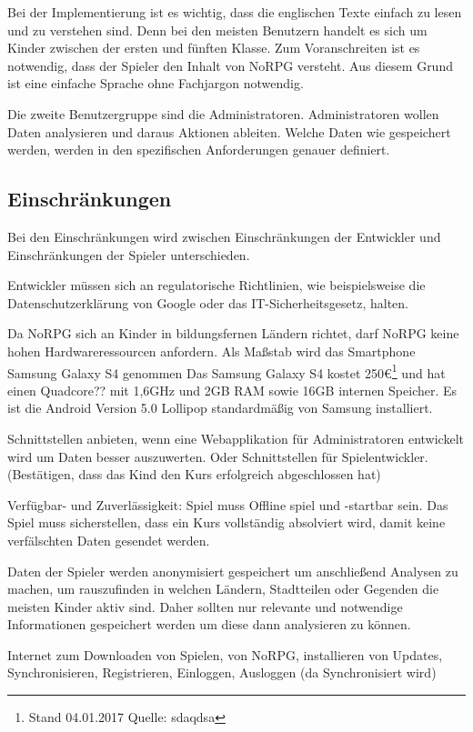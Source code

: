		Bei der Implementierung ist es wichtig, dass die englischen Texte einfach zu lesen und zu verstehen sind. Denn bei den meisten Benutzern handelt es sich um Kinder zwischen der ersten und fünften Klasse. Zum Voranschreiten ist es notwendig, dass der Spieler den Inhalt von NoRPG versteht. Aus diesem Grund ist eine einfache Sprache ohne Fachjargon notwendig.
		
		Die zweite Benutzergruppe sind die Administratoren.	Administratoren wollen Daten analysieren und daraus Aktionen ableiten. Welche Daten wie gespeichert werden, werden in den spezifischen Anforderungen genauer definiert. 
			
	\subsection{Einschränkungen}
		Bei den Einschränkungen wird zwischen Einschränkungen der Entwickler und Einschränkungen der Spieler unterschieden.
		
		Entwickler müssen sich an regulatorische Richtlinien, wie beispielsweise die Datenschutzerklärung von Google oder das IT-Sicherheitsgesetz, halten.
				
		Da NoRPG sich an Kinder in bildungsfernen Ländern richtet, darf NoRPG keine hohen Hardwareressourcen anfordern. Als Maßstab wird das Smartphone Samsung Galaxy S4 genommen %
		Das Samsung Galaxy S4 kostet 250€\footnote{Stand 04.01.2017 Quelle: sdaqdsa} und hat einen Quadcore?? mit 1,6GHz und 2GB RAM sowie 16GB internen Speicher. Es ist die Android Version 5.0 Lollipop standardmäßig von Samsung installiert.
		
		Schnittstellen anbieten, wenn eine Webapplikation für Administratoren entwickelt wird um Daten besser auszuwerten. Oder Schnittstellen für Spielentwickler. (Bestätigen, dass das Kind den Kurs erfolgreich abgeschlossen hat)
				
		Verfügbar- und Zuverlässigkeit: Spiel muss Offline spiel und -startbar sein. Das Spiel muss sicherstellen, dass ein Kurs vollständig absolviert wird, damit keine verfälschten Daten gesendet werden. 

		Daten der Spieler werden anonymisiert gespeichert um anschließend Analysen zu machen, um rauszufinden in welchen Ländern, Stadtteilen oder Gegenden die meisten Kinder aktiv sind. Daher sollten nur relevante und notwendige Informationen gespeichert werden um diese dann analysieren zu können.
		
		Internet zum Downloaden von Spielen, von NoRPG, installieren von Updates, Synchronisieren, Registrieren, Einloggen, Ausloggen (da Synchronisiert wird) 
		

